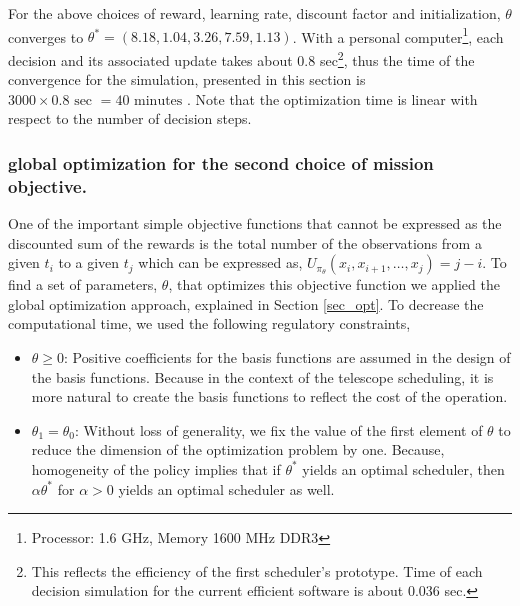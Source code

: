 \documentclass[12pt]{aastex62}
\theoremstyle{definition}
\begin{document}
For the above choices of reward, learning rate, discount factor and initialization, $\theta$ converges to $\theta^* = (8.18,  1.04,  3.26,  7.59,  1.13)$. With a personal computer\footnote{Processor: 1.6 GHz, Memory 1600 MHz DDR3}, each decision and its associated update takes about $0.8$ sec\footnote{This reflects the efficiency of the first scheduler's prototype. Time of each decision simulation for the current efficient software is about 0.036 sec.}, thus the time of the convergence for the simulation, presented in this section is $3000\times 0.8 \text{ sec } = 40 \text{ minutes }$. Note that the optimization time is linear with respect to the number of decision steps.

\subsubsection{global optimization for the second choice of mission objective.} 
One of the important simple objective functions that cannot be expressed as the discounted sum of the rewards is the total number of the observations from a given $t_i$ to a given $t_j$ which can be expressed as, $U_{\pi_{\theta}}(x_i, x_{i+1}, \dots, x_j) = j - i$. To find a set of parameters, $\theta$, that optimizes this objective function we applied the global optimization approach, explained in Section \ref{sec_opt}. To decrease the computational time, we used the following regulatory constraints,
%
\begin{itemize}
\item$\theta \geq 0$: Positive coefficients for the basis functions are assumed in the design of the basis functions. Because in the context of the telescope scheduling, it is more natural to create the basis functions to reflect the cost of the operation.
\item $\theta_1 =\theta_0$: Without loss of generality, we fix the value of the first element of $\theta$ to reduce the dimension of the optimization problem by one. Because, homogeneity of the policy implies that if $\theta^*$ yields an optimal scheduler, then $\alpha \theta^*$ for $\alpha > 0$ yields an optimal scheduler as well.
\end{itemize}
\end{document}
